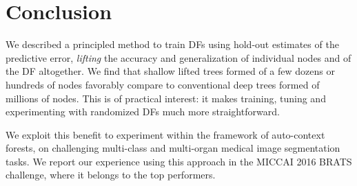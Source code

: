 
\section{Conclusion}
\label{sec:conc}

We described a principled method to train DFs using hold-out estimates of the predictive error, \textit{lifting} the accuracy and generalization of individual nodes and of the DF altogether. 
We find that shallow lifted trees formed of a few dozens or hundreds of nodes favorably compare to conventional deep trees formed of millions of nodes. This is of practical interest: it makes training, tuning and experimenting with randomized 
DFs much more straightforward.

We exploit this benefit to experiment within the framework of auto-context forests, on challenging multi-class and multi-organ medical image segmentation tasks. We report our experience using this approach in the MICCAI 2016 BRATS 
challenge, where it belongs to the top performers.


